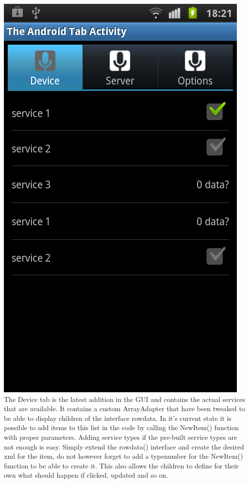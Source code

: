 \includegraphics[scale=0.50]{android-device.png}%
\\The Device tab is the latest addition in the GUI and contains the actual services that are available. It contains a custom ArrayAdapter that have been tweaked to be able to display children of the interface rowdata.
In it's current state it is possible to add items to this list in the code by calling the NewItem() function with proper parameters. Adding service types if the pre-built service types are not enough is easy. 
Simply extend the rowdata() interface and create the desired xml for the item, do not however forget to add a typenumber for the NewItem() function to be able to create it. 
This also allows the children to define for their own what should happen if clicked, updated and so on.






